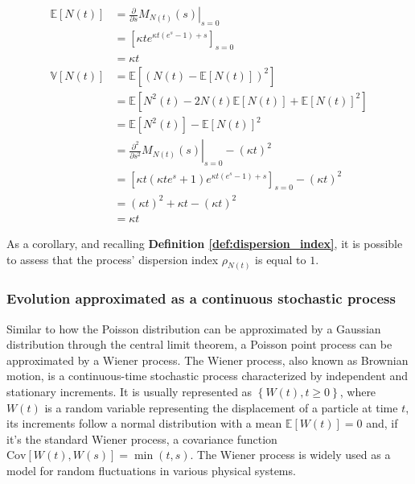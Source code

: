 \begin{align}
    \mathbb{E}\left[N(t)\right] &= \left.\frac{\partial}{\partial s}M_{N(t)}(s)\right|_{s=0}\\
    &= \left[\kappa t e^{\kappa t\left(e^s-1\right) + s}\right]_{s=0}\nonumber\\
    &= \kappa t\\
    \mathbb{V}\left[N(t)\right] &= \mathbb{E}\left[\left(N(t) - \mathbb{E}\left[N(t)\right]\right)^2\right]\\
    &= \mathbb{E}\left[N^2(t) -2N(t)\mathbb{E}\left[N(t)\right] + \mathbb{E}\left[N(t)\right]^2\right]\nonumber\\
    &= \mathbb{E}\left[N^2(t)\right] -\mathbb{E}\left[N(t)\right]^2\nonumber\\
    &= \left.\frac{\partial^2}{\partial s^2}M_{N(t)}(s)\right|_{s=0} - \left(\kappa t\right)^2\nonumber\\
    &= \left[\kappa t \left(\kappa t e^s + 1\right)e^{\kappa t\left(e^s - 1\right) + s}\right]_{s=0} - \left(\kappa t\right)^2\nonumber\\
    &= \left(\kappa t\right)^2 + \kappa t - \left(\kappa t\right)^2\nonumber\\
    &= \kappa t
\end{align}

As a corollary, and recalling \textbf{Definition \ref{def:dispersion_index}}, it is possible to assess that the process' dispersion index $\rho_{N(t)}$ is equal to $1$.

\subsubsection{Evolution approximated as a continuous stochastic process}\label{sec:evolution-approximated-as-a-continuous-stochastic-process}

Similar to how the Poisson distribution can be approximated by a Gaussian distribution through the central limit theorem, a Poisson point process can be approximated by a Wiener process. The Wiener process, also known as Brownian motion, is a continuous-time stochastic process characterized by independent and stationary increments. It is usually represented as $\left\{W(t), t \geq 0\right\}$, where $W(t)$ is a random variable representing the displacement of a particle at time $t$, its increments follow a normal distribution with a mean $\mathbb{E}[W(t)] = 0$ and, if it's the standard Wiener process, a covariance function $\text{Cov}[W(t), W(s)] = \min\left(t,s\right)$. The Wiener process is widely used as a model for random fluctuations in various physical systems.

